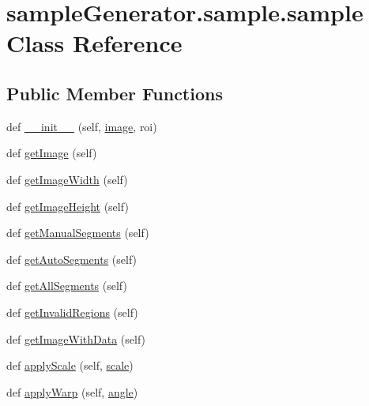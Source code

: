 \hypertarget{classsample_generator_1_1sample_1_1sample}{}\section{sample\+Generator.\+sample.\+sample Class Reference}
\label{classsample_generator_1_1sample_1_1sample}
\subsection*{Public Member Functions}
\begin{DoxyCompactItemize}
\item 
def \hyperlink{classsample_generator_1_1sample_1_1sample_addf374bb19797cca911962fcd108a568}{\+\_\+\+\_\+init\+\_\+\+\_\+} (self, \hyperlink{classsample_generator_1_1sample_1_1sample_a6ce5140cd9b1e8a992decaec244ffab3}{image}, roi)
\item 
def \hyperlink{classsample_generator_1_1sample_1_1sample_a7cd149af483afe13533c9572ded173ae}{get\+Image} (self)
\item 
def \hyperlink{classsample_generator_1_1sample_1_1sample_ab1d8c7ea79c8874ae0bdf808bc67e9e6}{get\+Image\+Width} (self)
\item 
def \hyperlink{classsample_generator_1_1sample_1_1sample_a06106232d720b3f6b169461f34469cfd}{get\+Image\+Height} (self)
\item 
def \hyperlink{classsample_generator_1_1sample_1_1sample_a438b1769d947de7ed27398144b6c990a}{get\+Manual\+Segments} (self)
\item 
def \hyperlink{classsample_generator_1_1sample_1_1sample_a7b1db0cd88b4e16937f628a1ce468853}{get\+Auto\+Segments} (self)
\item 
def \hyperlink{classsample_generator_1_1sample_1_1sample_a85de1984f20f2c3457791c09c274ae6f}{get\+All\+Segments} (self)
\item 
def \hyperlink{classsample_generator_1_1sample_1_1sample_aeec69654bd793c5b54df3483d4926df1}{get\+Invalid\+Regions} (self)
\item 
def \hyperlink{classsample_generator_1_1sample_1_1sample_aabf57b5d5eb0d1b6e89f28d5c0d97940}{get\+Image\+With\+Data} (self)
\item 
def \hyperlink{classsample_generator_1_1sample_1_1sample_ab97e323c321d16a707d6dac1f9e06723}{apply\+Scale} (self, \hyperlink{classsample_generator_1_1sample_1_1sample_a30515bba1d64f66e13e5eb8cc7b4cae4}{scale})
\item 
def \hyperlink{classsample_generator_1_1sample_1_1sample_a93fdd9624584a5452887a7efe5003849}{apply\+Warp} (self, \hyperlink{classsample_generator_1_1sample_1_1sample_ac472f4cf88aaab6e0d42f082a54d9d01}{angle})

\end{DoxyCompactItemize}
